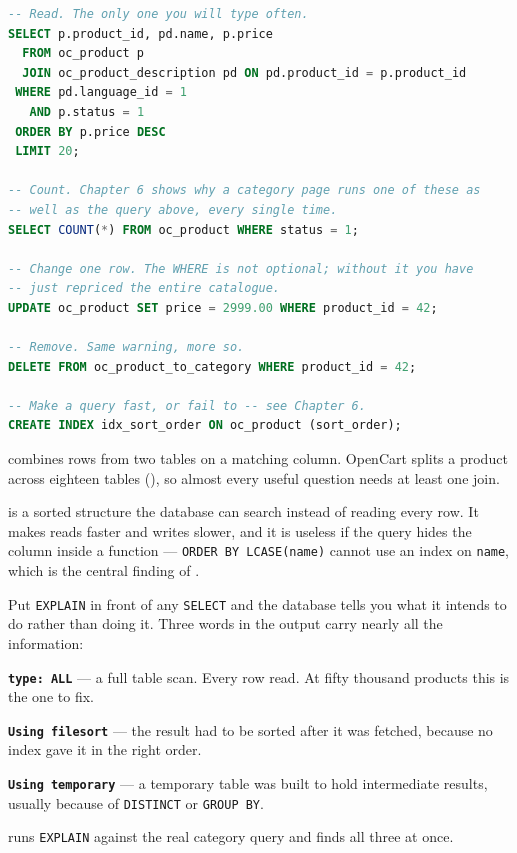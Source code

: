\begin{lstlisting}[language=sql]
-- Read. The only one you will type often.
SELECT p.product_id, pd.name, p.price
  FROM oc_product p
  JOIN oc_product_description pd ON pd.product_id = p.product_id
 WHERE pd.language_id = 1
   AND p.status = 1
 ORDER BY p.price DESC
 LIMIT 20;

-- Count. Chapter 6 shows why a category page runs one of these as
-- well as the query above, every single time.
SELECT COUNT(*) FROM oc_product WHERE status = 1;

-- Change one row. The WHERE is not optional; without it you have
-- just repriced the entire catalogue.
UPDATE oc_product SET price = 2999.00 WHERE product_id = 42;

-- Remove. Same warning, more so.
DELETE FROM oc_product_to_category WHERE product_id = 42;

-- Make a query fast, or fail to -- see Chapter 6.
CREATE INDEX idx_sort_order ON oc_product (sort_order);
\end{lstlisting}

\begin{definitionbox}
 combines rows from two tables on a matching column. OpenCart
splits a product across eighteen tables (), so almost every
useful question needs at least one join.

\smallskip
{} is a sorted structure the database can search instead of
reading every row. It makes reads faster and writes slower, and it is useless
if the query hides the column inside a function --- \texttt{ORDER BY
LCASE(name)} cannot use an index on \texttt{name}, which is the central finding
of .
\end{definitionbox}

\begin{examplebox}
Put \texttt{EXPLAIN} in front of any \texttt{SELECT} and the database tells you
what it intends to do rather than doing it. Three words in the output carry
nearly all the information:

\begin{tight}
  \item \textbf{\texttt{type: ALL}} --- a full table scan. Every row read. At
        fifty thousand products this is the one to fix.
  \item \textbf{\texttt{Using filesort}} --- the result had to be sorted after
        it was fetched, because no index gave it in the right order.
  \item \textbf{\texttt{Using temporary}} --- a temporary table was built to
        hold intermediate results, usually because of \texttt{DISTINCT} or
        \texttt{GROUP BY}.
\end{tight}

\smallskip
{} runs \texttt{EXPLAIN} against the real category query and
finds all three at once.
\end{examplebox}

